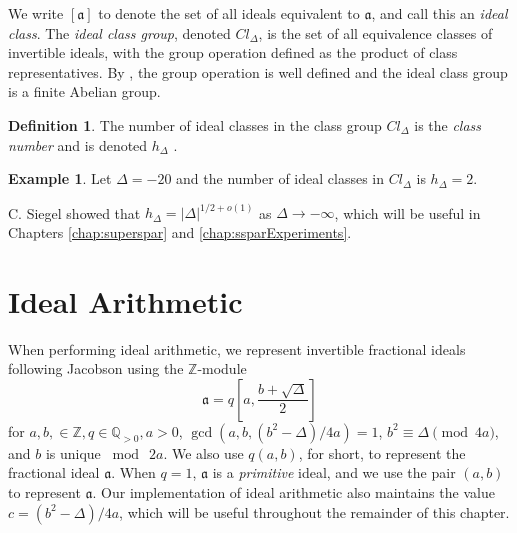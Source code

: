 \documentclass{ucalgthes1}
\theoremstyle{definition}
\newtheorem{defn}[thm]{Definition}
\newtheorem{example}[thm]{Example}
\newcommand{\ZZ}{\mathbb{Z}}
\newcommand{\QQgtz}{\mathbb{Q}_{>0}}
\newcommand{\ideal}{\mathfrak}
\newcommand{\idealclass}[1]{\left[ \ideal #1 \right]}
\newcommand{\aclass}{\idealclass a}
\begin{document}
We write $\aclass$ to denote the set of all ideals equivalent to $\ideal a$, and call this an \emph{ideal class}.  The \emph{ideal class group}, denoted $Cl_\Delta$, is the set of all equivalence classes of invertible ideals, with the group operation defined as the product of class representatives.  By \cite[p.136]{Cohn1980}, the group operation is well defined and the ideal class group is a finite Abelian group.

\begin{defn}
The number of ideal classes in the class group $Cl_\Delta$ is the \emph{class number} and is denoted $h_\Delta$ \cite[p.153]{Jacobson2009}.
\end{defn}

\begin{example}
Let $\Delta = -20$ and the number of ideal classes in $Cl_\Delta$ is $h_\Delta = 2$.
\end{example}

\noindent
C. Siegel \cite[p.247]{Crandall2001} showed that $h_\Delta = |\Delta|^{1/2 + o(1)}$ as $\Delta \rightarrow -\infty$, which will be useful in Chapters \ref{chap:superspar} and \ref{chap:ssparExperiments}.


\section{Ideal Arithmetic}
\label{sec:idealArithmetic}

%


When performing ideal arithmetic, we represent invertible fractional ideals following Jacobson \cite[p.13, Equation 2.1]{Jacobson1999} using the $\ZZ$-module
\[
	\ideal a = q\left[a, \frac{b+\sqrt{\Delta}}{2} \right]
\]
for $a, b, \in \ZZ, q \in \QQgtz, a > 0$, $\gcd(a, b, (b^2-\Delta)/4a) = 1$, $b^2 \equiv \Delta \pmod{4a}$, and $b$ is unique $\bmod ~2a$.  We also use $q(a, b)$, for short, to represent the fractional ideal $\ideal a$.  When $q = 1$, $\ideal a$ is a \emph{primitive} ideal, and we use the pair $(a, b)$ to represent $\ideal a$.  Our implementation of ideal arithmetic also maintains the value $c = (b^2 - \Delta)/4a$, which will be useful throughout the remainder of this chapter.
\end{document}

